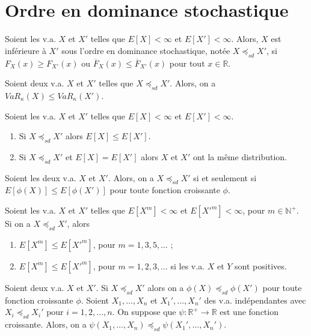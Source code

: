 \section{Ordre en dominance stochastique}

\begin{definition}{}{}
	Soient les v.a. $X$ et $X'$ telles que $E[X] < \infty$ et $E[X']< \infty$. Alors, $X$ est inférieure à $X'$ sous l'ordre en dominance stochastique, notée $X \preceq_{sd}X'$, si $F_X(x) \geq F_{X'}(x)$ ou $\overline{F}_X(x) \leq \overline{F}_{X'}(x)$ pour tout $x\in \mathbb{R}$. 
\end{definition}

\begin{proposition}{}{}
	Soient deux v.a. $X$ et $X'$ telles que $X \preceq_{sd} X'$. Alors, on a $VaR_\kappa(X) \leq VaR_\kappa(X')$. 
\end{proposition}

\begin{theoreme}{}{}
	Soient les v.a. $X$ et $X'$ telles que $E[X] <\infty$ et $E[X'] < \infty$. 
	\begin{enumerate}
		\item Si $X \preceq_{sd} X'$ alors $E[X] \leq E[X']$. 
		\item Si $X \preceq_{sd} X'$ et $E[X] = E[X']$ alors $X$ et $X'$ ont la même distribution. 
	\end{enumerate}
\end{theoreme}

\begin{theoreme}{}{}
	Soient les deux v.a. $X$ et $X'$. Alors, on a $X\preceq_{sd} X'$ si et seulement si $E[\phi(X)] \leq E[\phi(X')]$ pour toute fonction croissante $\phi$. 
\end{theoreme}

\begin{theoreme}{}{}
	Soient les v.a. $X$ et $X'$ telles que $E[X^m] < \infty$ et $E[X'^m]<\infty$, pour $m\in\mathbb{N}^+$. Si on a $X \preceq_{sd} X'$, alors
	\begin{enumerate}
		\item $E[X^m]\leq E[X'^m]$, pour $m = 1, 3, 5, \dots$ ;
		\item $E[X^m]\leq E[X'^m]$, pour $m = 1, 2, 3,  \dots$ si les v.a. $X$ et $Y$ sont positives. 
	\end{enumerate}
\end{theoreme}

\begin{theoreme}{}{}
	Soient deux v.a. $X$ et $X'$. Si $X \preceq_{sd} X'$ alors on a $\phi(X) \preceq_{sd} \phi(X')$ pour toute fonction croissante $\phi$. 
	\tcblower
	Soient $X_1, \dots, X_n$ et $X_1', \dots, X_n'$ des v.a. indépendantes avec $X_i \preceq_{sd} X_i'$ pour $i = 1, 2, \dots, n$. On suppose que $\psi : \mathbb{R}^+ \to \mathbb{R}$ est une fonction croissante. Alors, on a $\psi(X_1, \dots, X_n) \preceq_{sd} \psi(X_1', \dots, X_n')$.  
\end{theoreme}

